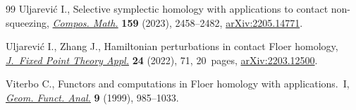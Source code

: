 \documentclass[10pt,a4paper]{amsart}
\numberwithin{equation}{section}
\theoremstyle{definition}
\begin{document}
\begin{thebibliography}{99}
Uljarevi\'c I., Selective symplectic homology with applications to contact
 non-squeezing,
 \href{https://doi.org/10.1112/s0010437x23007480}{\textit{Compos. Math.}}
 \textbf{159} (2023), 2458--2482,
 \href{http://arxiv.org/abs/2205.14771}{arXiv:2205.14771}.

Uljarevi\'c I., Zhang J., Hamiltonian perturbations in contact {F}loer
 homology, \href{https://doi.org/10.1007/s11784-022-00986-1}{\textit{J.~Fixed
 Point Theory Appl.}} \textbf{24} (2022), 71, 20~pages,
 \href{http://arxiv.org/abs/2203.12500}{arXiv:2203.12500}.

Viterbo C., Functors and computations in {F}loer homology with
 applications.~{I}, \href{https://doi.org/10.1007/s000390050106}{\textit{Geom.
 Funct. Anal.}} \textbf{9} (1999), 985--1033.

\end{thebibliography}
\end{document}
